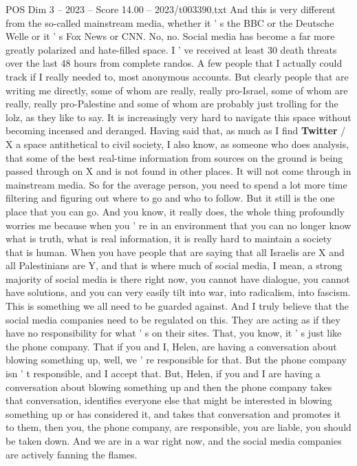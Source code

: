 \begin{textsample}{POS Dim 3 – 2023 – Score 14.00 – 2023/t003390.txt}
And this is very different from the so-called mainstream media, whether it ' s the BBC or the Deutsche Welle or it ' s Fox News or CNN.
No, no.
Social media has become a far more greatly polarized and hate-filled space.
I ' ve received at least 30 death threats over the last 48 hours from complete randos.
A few people that I actually could track if I really needed to, most anonymous accounts.
But clearly people that are writing me directly, some of whom are really, really pro-Israel, some of whom are really, really pro-Palestine and some of whom are probably just trolling for the lolz, as they like to say.
It is increasingly very hard to navigate this space without becoming incensed and deranged.
Having said that, as much as I find \textbf{Twitter} / X a space antithetical to civil society, I also know, as someone who does analysis, that some of the best real-time information from sources on the ground is being passed through on X and is not found in other places.
It will not come through in mainstream media.
So for the average person, you need to spend a lot more time filtering and figuring out where to go and who to follow.
But it still is the one place that you can go.
And you know, it really does, the whole thing profoundly worries me because when you ' re in an environment that you can no longer know what is truth, what is real information, it is really hard to maintain a society that is human.
When you have people that are saying that all Israelis are X and all Palestinians are Y, and that is where much of social media, I mean, a strong majority of social media is there right now, you cannot have dialogue, you cannot have solutions, and you can very easily tilt into war, into radicalism, into fascism.
This is something we all need to be guarded against.
And I truly believe that the social media companies need to be regulated on this.
They are acting as if they have no responsibility for what ' s on their sites.
That, you know, it ' s just like the phone company.
That if you and I, Helen, are having a conversation about blowing something up, well, we ' re responsible for that.
But the phone company isn ' t responsible, and I accept that.
But, Helen, if you and I are having a conversation about blowing something up and then the phone company takes that conversation, identifies everyone else that might be interested in blowing something up or has considered it, and takes that conversation and promotes it to them, then you, the phone company, are responsible, you are liable, you should be taken down.
And we are in a war right now, and the social media companies are actively fanning the flames.

\end{textsample}
